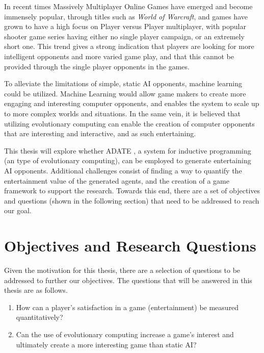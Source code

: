 In recent times Massively Multiplayer Online Games have emerged and become
immensely popular, through titles such as \emph{World of Warcraft}, and games
have grown to have a high focus on Player versus Player multiplayer, with
popular shooter game series having either no single player campaign, or an
extremely short one. This trend gives a strong indication that players are
looking for more intelligent opponents and more varied game play, and that this
cannot be provided through the single player opponents in the games.

To alleviate the limitations of simple, static AI opponents, machine learning
could be utilized. Machine Learning would allow game makers to create more
engaging and interesting computer opponents, and enables the system to scale up
to more complex worlds and situations. \citep{funge2004artificial} In the same
vein, it is believed that utilizing evolutionary computing can enable the
creation of computer opponents that are interesting and interactive, and as such
entertaining. \citep{yannakakis2005ai}

This thesis will explore whether ADATE \citep{olsson1994inductive}, a system for
inductive programming (an type of evolutionary computing), can be employed to
generate entertaining AI opponents. Additional challenges consist of finding a
way to quantify the entertainment value of the generated agents, and the
creation of a game framework to support the research. Towards this end, there
are a set of objectives and questions (shown in the following section) that need
to be addressed to reach our goal.

\section{Objectives and Research Questions}
\label{sec:objective}

Given the motivation for this thesis, there are a selection of questions to be
addressed to further our objectives. The questions that will be answered in this
thesis are as follows.

\begin{enumerate}
\item How can a player's satisfaction in a game (entertainment) be measured
  quantitatively?
\item Can the use of evolutionary computing increase a game's interest and
  ultimately create a more interesting game than static AI?
\end{enumerate}

